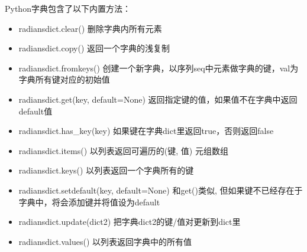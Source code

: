 Python字典包含了以下内置方法：
\begin{itemize}
\item 	radiansdict.clear()
删除字典内所有元素
\item	radiansdict.copy()
返回一个字典的浅复制
\item	radiansdict.fromkeys()
创建一个新字典，以序列seq中元素做字典的键，val为字典所有键对应的初始值
\item	radiansdict.get(key, default=None)
返回指定键的值，如果值不在字典中返回default值
\item	radiansdict.has\_key(key)
如果键在字典dict里返回true，否则返回false
\item	radiansdict.items()
以列表返回可遍历的(键, 值) 元组数组
\item	radiansdict.keys()
以列表返回一个字典所有的键
\item	radiansdict.setdefault(key, default=None)
和get()类似, 但如果键不已经存在于字典中，将会添加键并将值设为default
\item	radiansdict.update(dict2)
把字典dict2的键/值对更新到dict里
\item	radiansdict.values()
以列表返回字典中的所有值
\end{itemize}






